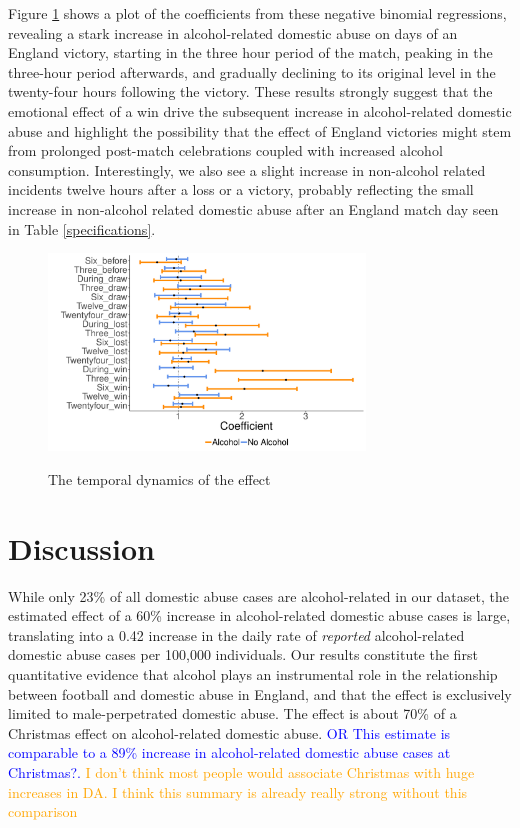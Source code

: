 \documentclass[12pt, letterpaper]{article}
\newcommand{\TM}[1] {{\textcolor{orange}{#1}}}
\newcommand{\AT}[1] {{\textcolor{blue}{#1}}}
\begin{document}
Figure \ref{fig:threehours} shows a plot of the coefficients from these negative binomial regressions, revealing a stark increase in alcohol-related domestic abuse on days of an England victory, starting in the three hour period of the match, peaking in the three-hour period afterwards, and gradually declining to its original level in the twenty-four hours following the victory. These results strongly suggest that the emotional effect of a win drive the subsequent increase in alcohol-related domestic abuse and highlight the possibility that the effect of England victories might stem from prolonged post-match celebrations coupled with increased alcohol consumption.  Interestingly, we also see a slight increase in non-alcohol related incidents twelve hours after a loss or a victory, probably reflecting the small increase in non-alcohol related domestic abuse after an England match day seen in Table \ref{specifications}.


\begin{figure}
\centering
 \caption{The temporal dynamics of the effect}
\includegraphics[width=0.75\textwidth]{Threehours.pdf}
\label{fig:threehours}
\end{figure}

\newpage

\section{Discussion}

While only 23\% of all domestic abuse cases are alcohol-related in our dataset, the estimated effect of a 60\% increase in alcohol-related domestic abuse cases is large, translating into a 0.42 increase in the daily rate of \textit{reported} alcohol-related domestic abuse cases per 100,000 individuals. Our results constitute the first quantitative evidence that alcohol plays an instrumental role in the relationship between football and domestic abuse in England, and that the effect is exclusively limited to male-perpetrated domestic abuse. The effect is about 70\% of a Christmas effect on alcohol-related domestic abuse. \AT{OR This estimate is comparable to a 89\% increase in alcohol-related domestic abuse cases at Christmas?.} \TM{I don't think most people would associate Christmas with huge increases in DA. I think this summary is already really strong without this comparison}
 
\end{document}
